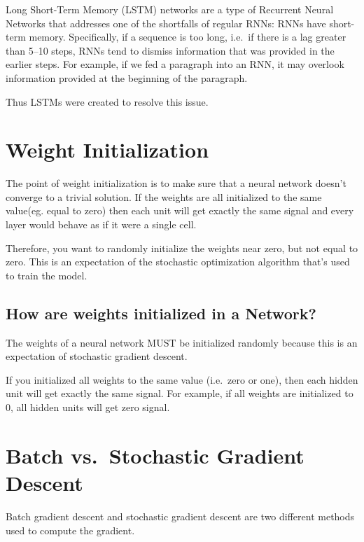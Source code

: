 \documentclass[
]{book}
\begin{document}
Long Short-Term Memory (LSTM) networks are a type of Recurrent Neural Networks that addresses one of the shortfalls of regular RNNs: RNNs have short-term memory.
Specifically, if a sequence is too long, i.e.~if there is a lag greater than 5--10 steps, RNNs tend to dismiss information that was provided in the earlier steps. For example, if we fed a paragraph into an RNN, it may overlook information provided at the beginning of the paragraph.

Thus LSTMs were created to resolve this issue.

\hypertarget{weight-initialization}{%
\section{Weight Initialization}\label{weight-initialization}}

The point of weight initialization is to make sure that a neural network doesn't converge to a trivial solution.
If the weights are all initialized to the same value(eg. equal to zero) then each unit will get exactly the same signal and every layer would behave as if it were a single cell.

Therefore, you want to randomly initialize the weights near zero, but not equal to zero. This is an expectation of the stochastic optimization algorithm that's used to train the model.

\hypertarget{how-are-weights-initialized-in-a-network}{%
\subsection{How are weights initialized in a Network?}\label{how-are-weights-initialized-in-a-network}}

The weights of a neural network MUST be initialized randomly because this is an expectation of stochastic gradient descent.

If you initialized all weights to the same value (i.e.~zero or one), then each hidden unit will get exactly the same signal. For example, if all weights are initialized to 0, all hidden units will get zero signal.

\hypertarget{batch-vs.-stochastic-gradient-descent}{%
\section{Batch vs.~Stochastic Gradient Descent}\label{batch-vs.-stochastic-gradient-descent}}

Batch gradient descent and stochastic gradient descent are two different methods used to compute the gradient.
\end{document}
